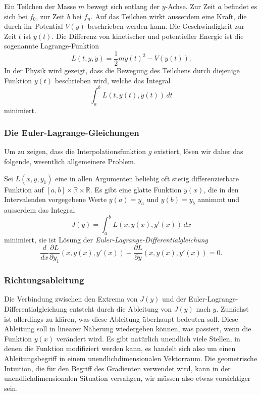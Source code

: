 \begin{beispiel}
Ein Teilchen der Masse $m$ bewegt sich entlang der $y$-Achse.
Zur Zeit $a$ befindet es sich bei $f_0$, zur Zeit $b$ bei $f_n$.
Auf das Teilchen wirkt ausserdem eine Kraft, die durch ihr Potential $V(y)$
beschrieben werden kann.
Die Geschwindigkeit zur Zeit $t$ ist $\dot y(t)$.
Die Differenz von kinetischer und potentieller Energie ist
die sogenannte Lagrange-Funktion
\begin{equation}
L(t,y,\dot{y})
=
\frac12m\dot{y}(t)^2
-
V(y(t)).
\label{buch:equation:mechlagrange}
\end{equation}
In der Physik wird gezeigt, dass die Bewegung des Teilchens durch diejenige
Funktion $y(t)$ beschrieben wird, welche das Integral
\[
\int_a^b L(t,y(t),\dot{y}(t))\,dt
\]
minimiert.
\end{beispiel}

\subsubsection{Die Euler-Lagrange-Gleichungen}
Um zu zeigen, dass die Interpolationsfunktion $g$ existiert, lösen
wir daher das folgende, wesentlich allgemeinere Problem.

\begin{satz}
\label{buch:satz:eulerlagrange}
Sei $L(x,y,y_1)$ eine in allen Argumenten beliebig oft stetig differenzierbare
Funktion auf $[a,b]\times \mathbb R \times \mathbb R$.
Es gibt eine glatte Funktion $y(x)$, die in den Intervalenden vorgegebene
Werte $y(a)=y_a$ und $y(b)=y_b$ annimmt und ausserdem das Integral
\[
J(y)
=
\int_a^b L(x, y(x), y'(x) ) \,dx
\]
minimiert,
sie ist Lösung der {\em Euler-Lagrange-Differentialgleichung}
\begin{equation}
\frac{d}{dx} \frac{\partial L}{\partial y_1} (x,y(x),y'(x))
-
\frac{\partial L}{\partial y} (x,y(x),y'(x))
=
0.
\label{buch:variation:eulerlagrange}
\end{equation}
\end{satz}

\subsubsection{Richtungsableitung}
Die Verbindung zwischen den Extrema von $J(y)$ und der
Euler-Lagrange-Differentialgleichung entsteht durch die Ableitung 
von $J(y)$ nach $y$.
Zunächst ist allerdings zu klären, was diese Ableitung überhaupt bedeuten
soll.
Diese Ableitung soll in linearer Näherung wiedergeben können, was
passiert, wenn die Funktion $y(x)$ verändert wird.
Es gibt natürlich unendlich viele Stellen, in denen die Funktion
modifiziert werden kann, es handelt sich also um einen Ableitungsbegriff
in einem unendlichdimensionalen Vektorraum.
Die geometrische Intuition, die für den Begriff des Gradienten
verwendet wird, kann in der unendlichdimensionalen Situation versahgen,
wir müssen also etwas vorsichtiger sein.

